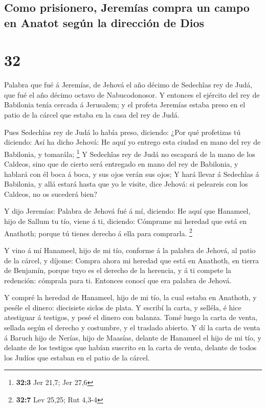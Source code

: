 \hypertarget{como-prisionero-jeremuxedas-compra-un-campo-en-anatot-seguxfan-la-direcciuxf3n-de-dios}{%
\subsection{Como prisionero, Jeremías compra un campo en Anatot según la
dirección de
Dios}\label{como-prisionero-jeremuxedas-compra-un-campo-en-anatot-seguxfan-la-direcciuxf3n-de-dios}}

\hypertarget{section-31}{%
\section{32}\label{section-31}}

 Palabra que fué á Jeremías, de Jehová el año décimo de
Sedechîas rey de Judá, que fué el año décimo octavo de Nabucodonosor.
 Y entonces el ejército del rey de Babilonia tenía cercada á
Jerusalem; y el profeta Jeremías estaba preso en el patio de la cárcel
que estaba en la casa del rey de Judá.

 Pues Sedechîas rey de Judá lo había preso, diciendo: ¿Por
qué profetizas tú diciendo: Así ha dicho Jehová: He aquí yo entrego esta
ciudad en mano del rey de Babilonia, y tomarála; \footnote{\textbf{32:3}
  Jer 21,7; Jer 27,6}  Y Sedechîas rey de Judá no escapará
de la mano de los Caldeos, sino que de cierto será entregado en mano del
rey de Babilonia, y hablará con él boca á boca, y sus ojos verán sus
ojos;  Y hará llevar á Sedechîas á Babilonia, y allá estará
hasta que yo le visite, dice Jehová: si peleareis con los Caldeos, no os
sucederá bien?

 Y dijo Jeremías: Palabra de Jehová fué á mí, diciendo:
 He aquí que Hanameel, hijo de Sallum tu tío, viene á ti,
diciendo: Cómprame mi heredad que está en Anathoth; porque tú tienes
derecho á ella para comprarla. \footnote{\textbf{32:7} Lev 25,25; Rut
  4,3-4}

 Y vino á mí Hanameel, hijo de mi tío, conforme á la palabra
de Jehová, al patio de la cárcel, y díjome: Compra ahora mi heredad que
está en Anathoth, en tierra de Benjamín, porque tuyo es el derecho de la
herencia, y á ti compete la redención: cómprala para ti. Entonces conocí
que era palabra de Jehová.

 Y compré la heredad de Hanameel, hijo de mi tío, la cual
estaba en Anathoth, y peséle el dinero: diecisiete siclos de plata.
 Y escribí la carta, y selléla, é hice atestiguar á
testigos, y pesé el dinero con balanza.  Tomé luego la
carta de venta, sellada según el derecho y costumbre, y el traslado
abierto.  Y dí la carta de venta á Baruch hijo de Nerías,
hijo de Maasías, delante de Hanameel el hijo de mi tío, y delante de los
testigos que habían suscrito en la carta de venta, delante de todos los
Judíos que estaban en el patio de la cárcel.

